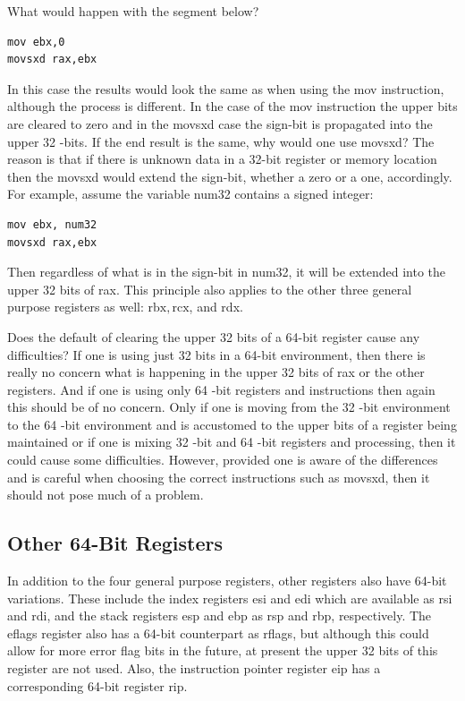 \documentclass[10pt]{book}
\begin{document}
What would happen with the segment below?
\begin{verbatim}
mov ebx,0
movsxd rax,ebx
\end{verbatim}

In this case the results would look the same as when using the mov instruction, although the process is different. In the case of the mov instruction the upper bits are cleared to zero and in the movsxd case the sign-bit is propagated into the upper 32 -bits. If the end result is the same, why would one use movsxd? The reason is that if there is unknown data in a 32-bit register or memory location then the movsxd would extend the sign-bit, whether a zero or a one, accordingly. For example, assume the variable num32 contains a signed integer:

\begin{verbatim}
mov ebx, num32
movsxd rax,ebx
\end{verbatim}

Then regardless of what is in the sign-bit in num32, it will be extended into the upper 32 bits of rax. This principle also applies to the other three general purpose registers as well: $\mathrm{rbx}, \mathrm{rcx}$, and rdx.

Does the default of clearing the upper 32 bits of a 64-bit register cause any difficulties? If one is using just 32 bits in a 64-bit environment, then there is really no concern what is happening in the upper 32 bits of rax or the other registers. And if one is using only 64 -bit registers and instructions then again this should be of no concern. Only if one is moving from the 32 -bit environment to the 64 -bit environment and is accustomed to the upper bits of a register being maintained or if one is mixing 32 -bit and 64 -bit registers and processing, then it could cause some difficulties. However, provided one is aware of the differences and is careful when choosing the correct instructions such as movsxd, then it should not pose much of a problem.

\subsection{Other 64-Bit Registers}
In addition to the four general purpose registers, other registers also have 64-bit variations. These include the index registers esi and edi which are available as rsi and rdi, and the stack registers esp and ebp as rsp and rbp, respectively. The eflags register also has a 64-bit counterpart as rflags, but although this could allow for more error flag bits in the future, at present the upper 32 bits of this register are not used. Also, the instruction pointer register eip has a corresponding 64-bit register rip.
\end{document}
